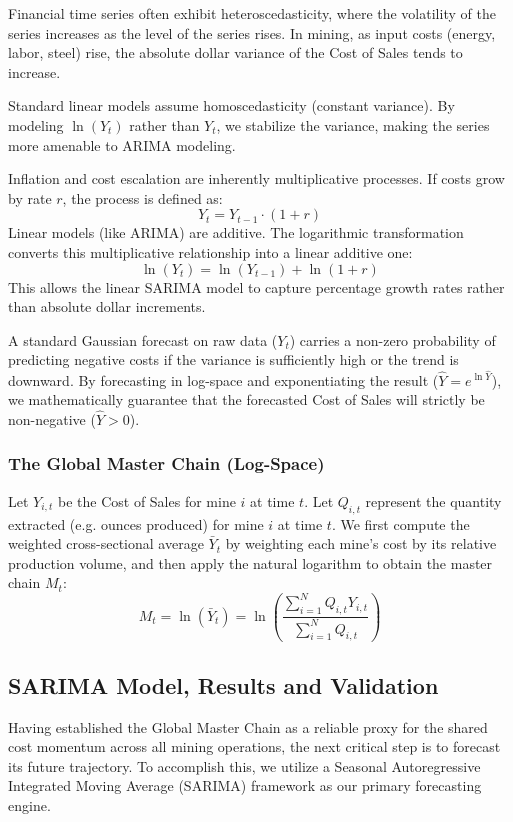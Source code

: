 Financial time series often exhibit heteroscedasticity, where the volatility of the series increases as the level of the series rises. In mining, as input costs (energy, labor, steel) rise, the absolute dollar variance of the Cost of Sales tends to increase.

Standard linear models assume homoscedasticity (constant variance). By modeling $\ln(Y_t)$ rather than $Y_t$, we stabilize the variance, making the series more amenable to ARIMA modeling.

Inflation and cost escalation are inherently multiplicative processes. If costs grow by rate $r$, the process is defined as:
\[ Y_t = Y_{t-1} \cdot (1+r) \]
Linear models (like ARIMA) are additive. The logarithmic transformation converts this multiplicative relationship into a linear additive one:
\[ \ln(Y_t) = \ln(Y_{t-1}) + \ln(1+r) \]
This allows the linear SARIMA model to capture percentage growth rates rather than absolute dollar increments.

A standard Gaussian forecast on raw data ($Y_t$) carries a non-zero probability of predicting negative costs if the variance is sufficiently high or the trend is downward. By forecasting in log-space and exponentiating the result ($\hat{Y} = e^{\ln \hat{Y}}$), we mathematically guarantee that the forecasted Cost of Sales will strictly be non-negative ($\hat{Y} > 0$).
\subsubsection{The Global Master Chain (Log-Space)}
\begin{definition}
Let $Y_{i,t}$ be the Cost of Sales for mine $i$ at time $t$. Let $Q_{i,t}$ represent the quantity extracted (e.g. ounces produced) for mine $i$ at time $t$. We first compute the weighted cross-sectional average $\bar{Y}_t$ by weighting each mine's cost by its relative production volume, and then apply the natural logarithm to obtain the master chain $M_t$:
\[
M_t = \ln(\bar{Y}_t) = \ln\left( \frac{\sum_{i=1}^{N} Q_{i,t} Y_{i,t}}{\sum_{i=1}^{N} Q_{i,t}} \right)
\]
\end{definition}
\subsection{SARIMA Model, Results and Validation}
Having established the Global Master Chain as a reliable proxy for the shared cost momentum across all mining operations, the next critical step is to forecast its future trajectory. To accomplish this, we utilize a Seasonal Autoregressive Integrated Moving Average (SARIMA) framework  as our primary forecasting engine. 

